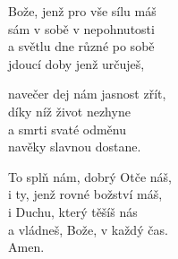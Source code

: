 \begin{translatioMulticol}{3}
Bože, jenž pro vše sílu máš\\
sám v sobě v nepohnutosti\\
a světlu dne různé po sobě\\
jdoucí doby jenž určuješ,\columnbreak

navečer dej nám jasnost zřít,\\
díky níž život nezhyne\\
a smrti svaté odměnu\\
navěky slavnou dostane.\columnbreak

To splň nám, dobrý Otče náš,\\
i ty, jenž rovné božství máš,\\
i Duchu, který těšíš nás\\
a vládneš, Bože, v každý čas.\\
Amen.
\end{translatioMulticol}
